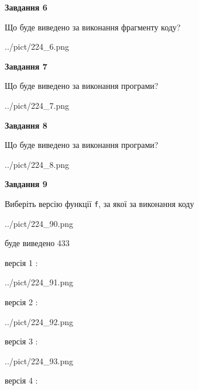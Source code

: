 \documentclass[12pt, ukrainian]{article}
\def\code#1{\Verb!#1!}
\begin{document}
{\begin {large}
{\begin {center}\textbf{Завдання 6}\end {center}}

Що буде виведено за виконання фрагменту коду?\par
\begin{center}
	{../pict/224_6.png}
\end{center}
\newpage

{\begin {center}\textbf{Завдання 7}\end {center}}

Що буде виведено за виконання програми?\par
\begin{center}
	{../pict/224_7.png}
\end{center}
\newpage

{\begin {center}\textbf{Завдання 8}\end {center}}

Що буде виведено за виконання програми?\par
\begin{center}
	{../pict/224_8.png}
\end{center}
\newpage

{\begin {center}\textbf{Завдання 9}\end {center}}

Виберіть версію функції \code{f}, за якої за виконання коду
\begin{center}
	{../pict/224_90.png}
\end{center}
буде виведено 433

\vspace{5mm}
версія 1 :

\begin{center}
	{../pict/224_91.png}
\end{center}
версія 2 :

\begin{center}
	{../pict/224_92.png}
\end{center}
версія 3 :

\begin{center}
	{../pict/224_93.png}
\end{center}
версія 4 :


\end{large}}
\end{document}
